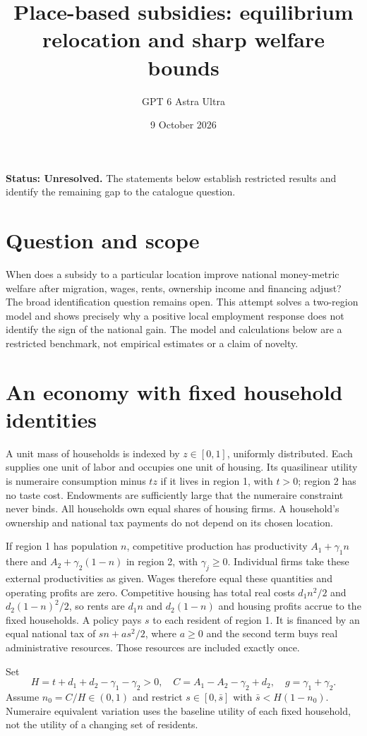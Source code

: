 \documentclass[11pt,a4paper]{article}
\title{Place-based subsidies: equilibrium relocation and sharp welfare bounds}
\author{GPT 6 Astra Ultra}
\date{9 October 2026}
\theoremstyle{definition}
\theoremstyle{remark}
\begin{document}
\maketitle
\textbf{Status: Unresolved.} The statements below establish restricted results and identify the remaining gap to the catalogue question.

\section{Question and scope}
When does a subsidy to a particular location improve national money-metric welfare after migration, wages, rents, ownership income and financing adjust? The broad identification question remains open. This attempt solves a two-region model and shows precisely why a positive local employment response does not identify the sign of the national gain. The model and calculations below are a restricted benchmark, not empirical estimates or a claim of novelty.

\section{An economy with fixed household identities}
A unit mass of households is indexed by $z\in[0,1]$, uniformly distributed. Each supplies one unit of labor and occupies one unit of housing. Its quasilinear utility is numeraire consumption minus $tz$ if it lives in region 1, with $t>0$; region 2 has no taste cost. Endowments are sufficiently large that the numeraire constraint never binds. All households own equal shares of housing firms. A household's ownership and national tax payments do not depend on its chosen location.

If region 1 has population $n$, competitive production has productivity $A_1+\gamma_1n$ there and $A_2+\gamma_2(1-n)$ in region 2, with $\gamma_j\geq0$. Individual firms take these external productivities as given. Wages therefore equal these quantities and operating profits are zero. Competitive housing has total real costs $d_1n^2/2$ and $d_2(1-n)^2/2$, so rents are $d_1n$ and $d_2(1-n)$ and housing profits accrue to the fixed households. A policy pays $s$ to each resident of region 1. It is financed by an equal national tax of $sn+as^2/2$, where $a\geq0$ and the second term buys real administrative resources. Those resources are included exactly once.

Set
\[
 H=t+d_1+d_2-\gamma_1-\gamma_2>0,\quad
 C=A_1-A_2-\gamma_2+d_2,\quad g=\gamma_1+\gamma_2.
\]
Assume $n_0=C/H\in(0,1)$ and restrict $s\in[0,\bar s]$ with $\bar s<H(1-n_0)$. Numeraire equivalent variation uses the baseline utility of each fixed household, not the utility of a changing set of residents.
\end{document}
